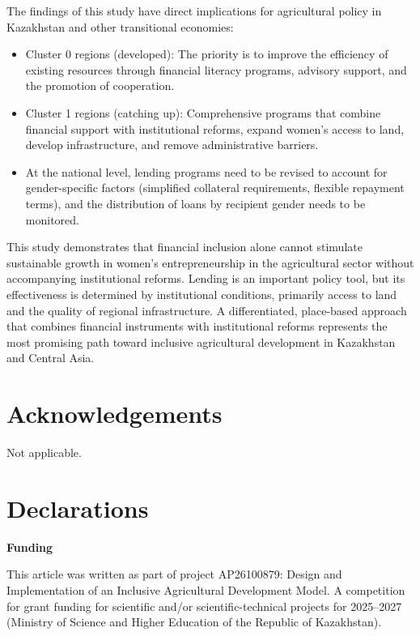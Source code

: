 ﻿\documentclass[pdflatex,sn-mathphys-ay]{sn-jnl}
\begin{document}
The findings of this study have direct implications for agricultural
policy in Kazakhstan and other transitional economies:

\begin{itemize}
\item Cluster 0 regions (developed): The priority is to improve the
efficiency of existing resources through financial literacy programs,
advisory support, and the promotion of cooperation.
\item Cluster 1 regions (catching up): Comprehensive programs that
combine financial support with institutional reforms, expand women's
access to land, develop infrastructure, and remove administrative
barriers.
\item At the national level, lending programs need to be revised to
account for gender-specific factors (simplified collateral
requirements, flexible repayment terms), and the distribution of loans by
recipient gender needs to be monitored.
\end{itemize}

This study demonstrates that financial inclusion alone cannot stimulate
sustainable growth in women's entrepreneurship in the agricultural
sector without accompanying institutional reforms. Lending is an
important policy tool, but its effectiveness is determined by
institutional conditions, primarily access to land and the quality of
regional infrastructure. A differentiated, place-based approach that
combines financial instruments with institutional reforms represents the
most promising path toward inclusive agricultural development in
Kazakhstan and Central Asia.

\backmatter

\section*{Acknowledgements}

Not applicable.

\section*{Declarations}

\noindent\textbf{Funding}

This article was written as part of project AP26100879: Design and
Implementation of an Inclusive Agricultural Development Model. A
competition for grant funding for scientific and/or scientific-technical
projects for 2025--2027 (Ministry of Science and Higher Education of the
Republic of Kazakhstan).
\end{document}
